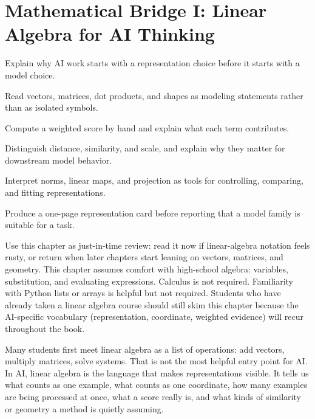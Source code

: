 \chapter*{Mathematical Bridge I: Linear Algebra for AI Thinking}

\begin{learninggoals}
\item Explain why AI work starts with a representation choice before it starts with a model choice.
\item Read vectors, matrices, dot products, and shapes as modeling statements rather than as isolated symbols.
\item Compute a weighted score by hand and explain what each term contributes.
\item Distinguish distance, similarity, and scale, and explain why they matter for downstream model behavior.
\item Interpret norms, linear maps, and projection as tools for controlling, comparing, and fitting representations.
\item Produce a one-page representation card before reporting that a model family is suitable for a task.
\end{learninggoals}

\begin{prereqbridge}
Use this chapter as just-in-time review: read it now if linear-algebra notation feels rusty, or return when later chapters start leaning on vectors, matrices, and geometry. This chapter assumes comfort with high-school algebra: variables, substitution, and evaluating expressions. Calculus is not required. Familiarity with Python lists or arrays is helpful but not required. Students who have already taken a linear algebra course should still skim this chapter because the AI-specific vocabulary (representation, coordinate, weighted evidence) will recur throughout the book.
\end{prereqbridge}

Many students first meet linear algebra as a list of operations: add vectors, multiply matrices, solve systems. That is not the most helpful entry point for AI. In AI, linear algebra is the language that makes representations visible. It tells us what counts as one example, what counts as one coordinate, how many examples are being processed at once, what a score really is, and what kinds of similarity or geometry a method is quietly assuming.

